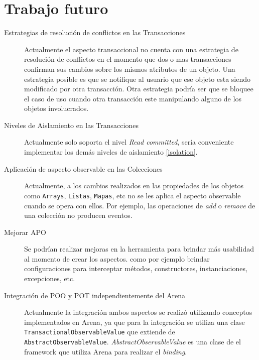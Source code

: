 
\section{Trabajo futuro}
\label{futurework}

\begin{description}

	\item[Estrategias de resolución de conflictos en las Transacciones]
		Actualmente el aspecto transaccional no cuenta con una estrategia de
		resolución de conflictos en	 el momento que dos o mas transacciones
		confirman sus cambios sobre los mismos atributos de un objeto.
		Una estrategia posible es que se notifique al usuario que ese
		objeto esta siendo modificado por otra transacción.
		Otra estrategia podría ser que se bloquee el caso de uso cuando otra
		transacción este manipulando alguno de los objetos involucrados.

	\item[Niveles de Aislamiento en las Transacciones]
		Actualmente solo soporta el nivel \emph{Read committed}, sería conveniente
		implementar los demás niveles de aislamiento \ref{isolation}.
	
	\item[Aplicación de aspecto observable en las Colecciones]
		Actualmente, a los cambios realizados en las propiedades de los objetos
		como \lstinline|Arrays|, \lstinline|Listas|, \lstinline|Mapas|, etc no se les
		aplica el aspecto observable cuando se opera con ellos. Por ejemplo, las
		operaciones de \emph{add} o \emph{remove} de una colección no producen
		eventos.
		
	\item[Mejorar APO]
		Se podrían realizar mejoras en la herramienta para brindar más usabilidad al
		momento de crear los aspectos. como por ejemplo brindar configuraciones para
		interceptar métodos, constructores, instanciaciones, excepciones, etc.
		
	\item[Integración de POO y POT independientemente del Arena]
		Actualmente la integración ambos aspectos se realizó utilizando conceptos
		implementados en Arena, ya que para la integración se utiliza una clase
		\lstinline|TransactionalObservableValue| que extiende de
		\lstinline|AbstractObservableValue|. \emph{AbstractObservableValue} es una
		clase de el framework que utiliza Arena para realizar el \emph{binding}.

\end{description}